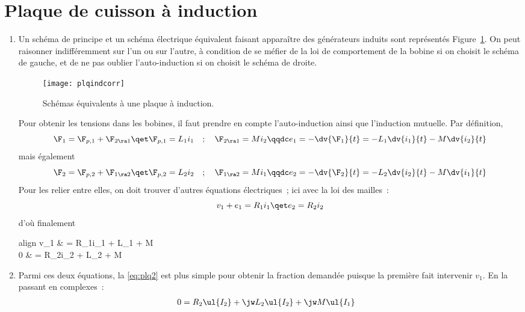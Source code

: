 \documentclass[a4paper, 10pt, final, garamond]{book}
\begin{document}
\section{Plaque de cuisson à induction}
\label{sec:plqindcorr}
\begin{enumerate}
	\item Un schéma de principe et un schéma électrique équivalent faisant
	      apparaître des générateurs induits sont représentés
	      Figure~\ref{fig:plqindcorr}. On peut raisonner indifféremment sur l'un
	      ou sur l'autre, à condition de se méfier de la loi de comportement de la
	      bobine si on choisit le schéma de gauche, et de ne pas oublier
	      l'auto-induction si on choisit le schéma de droite.
	      \begin{figure}[htbp]
		      \centering
		      \texttt{[image: plqindcorr]}
		      \caption{Schémas équivalents à une plaque à induction.}
		      \label{fig:plqindcorr}
	      \end{figure}
	      Pour obtenir les tensions dans les bobines, il faut prendre en compte
	      l'auto-induction ainsi que l'induction mutuelle. Par définition,
	      \[
		      \F_{1} = \F_{p,1} + \F_{2 \ra 1}
		      \qet
		      \F_{p,1} = L_1 i_1
		      \quad;\quad
		      \F_{2 \ra 1} = M i_2
		      \qqdc
		      e_1 = -\dv{\F_1}{t} = -L_1 \dv{i_1}{t} - M \dv{i_2}{t}
	      \]
	      mais également
	      \[
		      \F_{2} = \F_{p,2} + \F_{1 \ra 2}
		      \qet
		      \F_{p,2} = L_2 i_2
		      \quad;\quad
		      \F_{1 \ra 2} = M i_1
		      \qqdc
		      e_2 = -\dv{\F_2}{t} = -L_2 \dv{i_2}{t} - M \dv{i_1}{t}
	      \]
	      Pour les relier entre elles, on doit trouver d'autres équations
	      électriques~; ici avec la loi des mailles~:
	      \[
		      v_1 + e_1 = R_1i_1
		      \qet
		      e_2 = R_2i_2
	      \]
	      d'où finalement
	      \begin{empheq}[left=\empheqlbrace]{align}
		      \label{eq:plq1}
		      v_1 & = R_1i_1 + L_1  + M 
		      \\
		      \label{eq:plq2}
		      0 & = R_2i_2 + L_2  + M 
	      \end{empheq}
	\item Parmi ces deux équations, la \ref{eq:plq2} est plus simple pour
	      obtenir la fraction demandée puisque la première fait intervenir $v_1$.
	      En la passant en complexes~:
	      \begin{align}
		      0              & = R_2 \ul{I_2} + \jw L_2 \ul{I_2} + \jw M \ul{I_1}

\end{align}
\end{enumerate}
\end{document}
